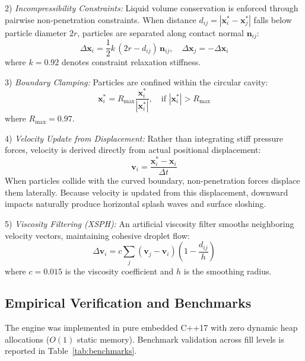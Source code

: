 \documentclass[conference]{IEEEtran}
\begin{document}
2) \emph{Incompressibility Constraints:} Liquid volume conservation is enforced through pairwise non-penetration constraints. When distance $d_{ij} = |\mathbf{x}_i^* - \mathbf{x}_j^*|$ falls below particle diameter $2r$, particles are separated along contact normal $\mathbf{n}_{ij}$:
\begin{equation}
    \Delta \mathbf{x}_i = \frac{1}{2} k \, (2r - d_{ij}) \, \mathbf{n}_{ij}, \quad \Delta \mathbf{x}_j = -\Delta \mathbf{x}_i
\end{equation}
where $k = 0.92$ denotes constraint relaxation stiffness.

3) \emph{Boundary Clamping:} Particles are confined within the circular cavity:
\begin{equation}
    \mathbf{x}_i^* = R_{\text{max}} \frac{\mathbf{x}_i^*}{|\mathbf{x}_i^*|}, \quad \text{if } |\mathbf{x}_i^*| > R_{\text{max}}
\end{equation}
where $R_{\text{max}} = 0.97$.

4) \emph{Velocity Update from Displacement:} Rather than integrating stiff pressure forces, velocity is derived directly from actual positional displacement:
\begin{equation}
    \mathbf{v}_i = \frac{\mathbf{x}_i^* - \mathbf{x}_i}{\Delta t}
\end{equation}
When particles collide with the curved boundary, non-penetration forces displace them laterally. Because velocity is updated from this displacement, downward impacts naturally produce horizontal splash waves and surface sloshing.

5) \emph{Viscosity Filtering (XSPH):} An artificial viscosity filter smooths neighboring velocity vectors, maintaining cohesive droplet flow:
\begin{equation}
    \Delta \mathbf{v}_i = c \sum_{j} (\mathbf{v}_j - \mathbf{v}_i) \left(1 - \frac{d_{ij}}{h}\right)
\end{equation}
where $c = 0.015$ is the viscosity coefficient and $h$ is the smoothing radius.

\subsection{Empirical Verification and Benchmarks}
The engine was implemented in pure embedded C++17 with zero dynamic heap allocations ($O(1)$ static memory). Benchmark validation across fill levels is reported in Table~\ref{tab:benchmarks}.
\end{document}
